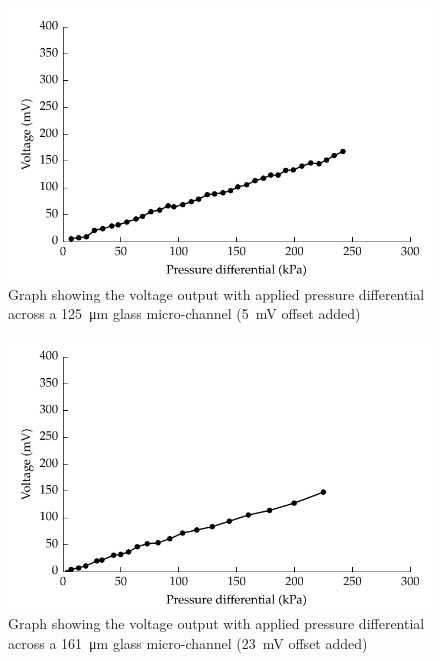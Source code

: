 \begin{figure}
    \centering
    \includegraphics{content/pt1/01-PowerHarvesting/graphics/streamingCell_voltVsPress_125um_out}
    \caption{\label{fig:VvsP_125um}Graph showing the voltage output with applied pressure differential across a \SI{125}{\micro\metre} glass micro-channel (\SI{5}{\milli\volt} offset added)}
\end{figure}

\begin{figure}
    \centering
    \includegraphics{content/pt1/01-PowerHarvesting/graphics/streamingCell_voltVsPress_161um_out}
    \caption{\label{fig:VvsP_161um}Graph showing the voltage output with applied pressure differential across a \SI{161}{\micro\metre} glass micro-channel (\SI{23}{\milli\volt} offset added)}
\end{figure}

